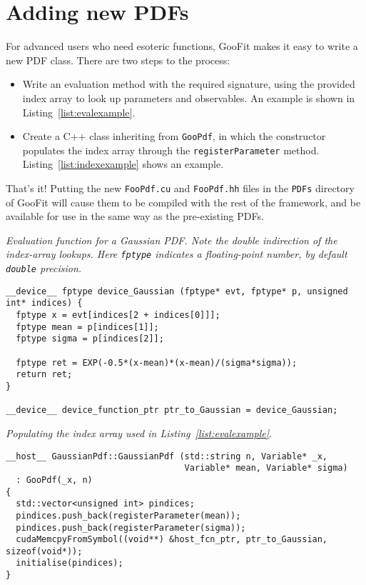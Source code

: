\section{Adding new PDFs}
\label{sec:newpdfs}

For advanced users who need esoteric functions, GooFit makes
it easy to write a new PDF class. There are two steps to the process:
\begin{itemize}
\item Write an evaluation method with the required signature,
using the provided index array to look up parameters and observables.
An example is shown in Listing~\ref{list:evalexample}.
\item Create a C++ class inheriting from \texttt{GooPdf}, in which
the constructor populates the index array through the \texttt{registerParameter}
method. Listing~\ref{list:indexexample} shows an example. 
\end{itemize}
That's it! Putting the new \texttt{FooPdf.cu} and \texttt{FooPdf.hh} files
in the \texttt{PDFs} directory of GooFit will cause them to be compiled with
the rest of the framework, and be available for use in the same way as the
pre-existing PDFs. 

\begin{listing}
\label{list:evalexample} \emph{Evaluation function for a Gaussian
PDF. Note the double indirection of the index-array lookups.
Here \texttt{fptype} indicates a floating-point number, by default \texttt{double}
precision.}

\begin{Verbatim}[commandchars=\\\$\#]
__device__ fptype device_Gaussian (fptype* evt, fptype* p, unsigned int* indices) {
  fptype x = evt[indices[2 + indices[0]]]; 
  fptype mean = p[indices[1]];
  fptype sigma = p[indices[2]];

  fptype ret = EXP(-0.5*(x-mean)*(x-mean)/(sigma*sigma));
  return ret; 
}

__device__ device_function_ptr ptr_to_Gaussian = device_Gaussian; 
\end{Verbatim}
\end{listing}

\begin{listing}
\label{list:indexexample} \emph{Populating the index array used in Listing~\ref{list:evalexample}}.

\begin{Verbatim}[commandchars=\\\$\#]
__host__ GaussianPdf::GaussianPdf (std::string n, Variable* _x, 
                                   Variable* mean, Variable* sigma) 
  : GooPdf(_x, n) 
{
  std::vector<unsigned int> pindices;
  pindices.push_back(registerParameter(mean));
  pindices.push_back(registerParameter(sigma));
  cudaMemcpyFromSymbol((void**) &host_fcn_ptr, ptr_to_Gaussian, sizeof(void*));
  initialise(pindices); 
}

\end{Verbatim}
\end{listing}
